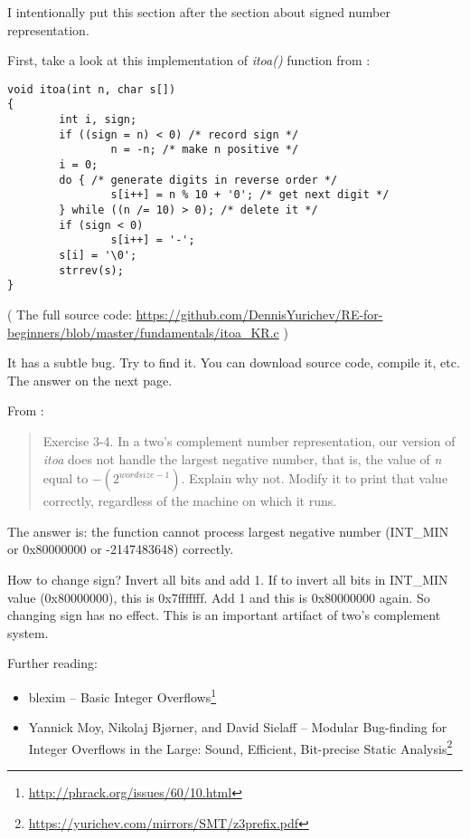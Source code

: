 
I intentionally put this section after the section about signed number representation.

First, take a look at this implementation of \emph{itoa()} function from \InSqBrackets{\KRBook}:

\begin{lstlisting}[style=customc]
void itoa(int n, char s[])
{
        int i, sign;
        if ((sign = n) < 0) /* record sign */
                n = -n; /* make n positive */
        i = 0;
        do { /* generate digits in reverse order */
                s[i++] = n % 10 + '0'; /* get next digit */
        } while ((n /= 10) > 0); /* delete it */
        if (sign < 0)
                s[i++] = '-';
        s[i] = '\0';
        strrev(s);
}
\end{lstlisting}

( The full source code: \url{https://github.com/DennisYurichev/RE-for-beginners/blob/master/fundamentals/itoa_KR.c} )

It has a subtle bug. Try to find it. You can download source code, compile it, etc.
The answer on the next page.

\clearpage

From \InSqBrackets{\KRBook}:

\begin{framed}
\begin{quotation}
Exercise 3-4. In a two's complement number representation, our version of \emph{itoa}
does not handle the largest negative number, that is, the value
of \emph{n} equal to $-(2^{wordsize-1})$. Explain why not. Modify it to
print that value correctly, regardless of the machine on which
it runs.
\end{quotation}
\end{framed}

The answer is: the function cannot process largest negative number (INT\_MIN or 0x80000000 or -2147483648) correctly.

How to change sign? Invert all bits and add 1.
If to invert all bits in INT\_MIN value (0x80000000), this is 0x7fffffff. Add 1 and this is 0x80000000 again.
So changing sign has no effect.
This is an important artifact of two's complement system.

Further reading:

\begin{itemize}
\item blexim -- Basic Integer Overflows\footnote{\url{http://phrack.org/issues/60/10.html}}

\item Yannick Moy, Nikolaj Bjørner, and David Sielaff -- Modular Bug-finding for Integer Overflows in the Large: Sound, Efficient, Bit-precise Static Analysis\footnote{\url{https://yurichev.com/mirrors/SMT/z3prefix.pdf}}
\end{itemize}

